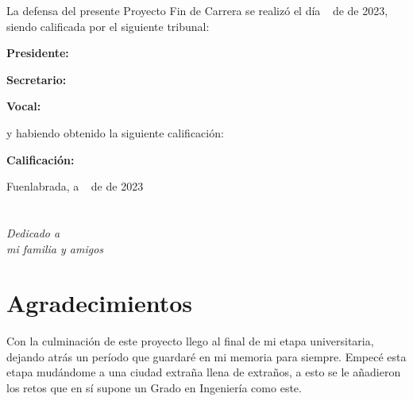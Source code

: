 \documentclass[a4paper, 12pt]{book}
\begin{document}
\vspace{1cm}
La defensa del presente Proyecto Fin de Carrera se realizó el día \qquad$\;\,$ de \qquad\qquad\qquad\qquad \newline de 2023, siendo calificada por el siguiente tribunal:


\vspace{0.5cm}
\textbf{Presidente:}

\vspace{1.2cm}
\textbf{Secretario:}

\vspace{1.2cm}
\textbf{Vocal:}


\vspace{1.2cm}
y habiendo obtenido la siguiente calificación:

\vspace{1cm}
\textbf{Calificación:}


\vspace{1cm}
\begin{flushright}
Fuenlabrada, a \qquad$\;\,$ de \qquad\qquad\qquad\qquad de 2023
\end{flushright}


\chapter*{}
\begin{flushright}
\textit{Dedicado a \\
mi familia y amigos}
\end{flushright}


\chapter*{Agradecimientos}

Con la culminación de este proyecto llego al final de mi etapa universitaria, dejando atrás un período que guardaré en mi memoria para siempre.
Empecé esta etapa mudándome a una ciudad extraña llena de extraños, a esto se le añadieron los retos que en sí supone un Grado en Ingeniería como este.
\end{document}
